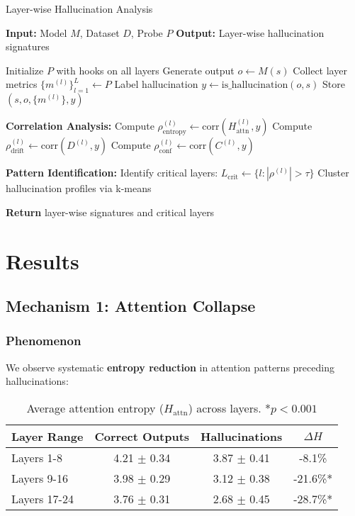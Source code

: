 \documentclass[11pt]{article}
\begin{document}
\begin{algorithm}
\caption{Layer-wise Hallucination Analysis}
\begin{algorithmic}[1]
\State \textbf{Input:} Model $M$, Dataset $D$, Probe $P$
\State \textbf{Output:} Layer-wise hallucination signatures

    \State Initialize $P$ with hooks on all layers
    \State Generate output $o \leftarrow M(s)$
    \State Collect layer metrics $\{m^{(l)}\}_{l=1}^{L} \leftarrow P$
    \State Label hallucination $y \leftarrow \text{is\_hallucination}(o, s)$
    \State Store $(s, o, \{m^{(l)}\}, y)$
\EndFor

\State \textbf{Correlation Analysis:}
    \State Compute $\rho_{\text{entropy}}^{(l)} \leftarrow \text{corr}(H_{\text{attn}}^{(l)}, y)$
    \State Compute $\rho_{\text{drift}}^{(l)} \leftarrow \text{corr}(D^{(l)}, y)$
    \State Compute $\rho_{\text{conf}}^{(l)} \leftarrow \text{corr}(C^{(l)}, y)$
\EndFor

\State \textbf{Pattern Identification:}
\State Identify critical layers: $L_{\text{crit}} \leftarrow \{l : |\rho^{(l)}| > \tau\}$
\State Cluster hallucination profiles via k-means

\State \textbf{Return} layer-wise signatures and critical layers
\end{algorithmic}
\end{algorithm}

\section{Results}

\subsection{Mechanism 1: Attention Collapse}

\subsubsection{Phenomenon}

We observe systematic \textbf{entropy reduction} in attention patterns preceding hallucinations:

\begin{table}[H]
\centering
\begin{tabular}{@{}lccc@{}}
\toprule
\textbf{Layer Range} & \textbf{Correct Outputs} & \textbf{Hallucinations} & \textbf{$\Delta H$} \\ \midrule
Layers 1-8 & 4.21 $\pm$ 0.34 & 3.87 $\pm$ 0.41 & -8.1\% \\
Layers 9-16 & 3.98 $\pm$ 0.29 & 3.12 $\pm$ 0.38 & -21.6\%* \\
Layers 17-24 & 3.76 $\pm$ 0.31 & 2.68 $\pm$ 0.45 & -28.7\%* \\ \bottomrule
\end{tabular}
\caption{Average attention entropy ($H_{\text{attn}}$) across layers. *$p < 0.001$}
\end{table}
\end{document}
